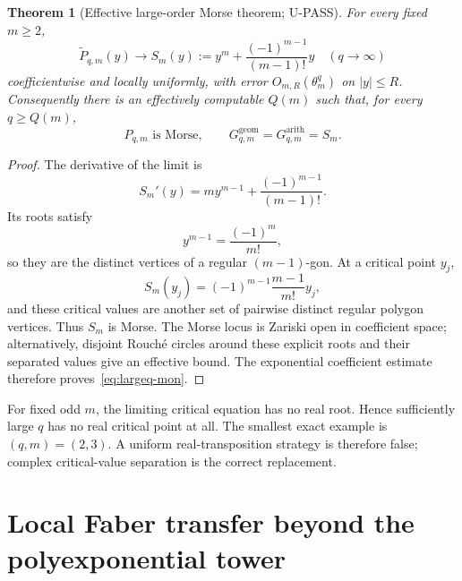 \documentclass[11pt]{article}
\theoremstyle{keio}
\newtheorem{theorem}{Theorem}[section]
\theoremstyle{definition}
\theoremstyle{remark}
\newcommand{\UPASS}{\textcolor{keiogreen}{\textsf{U-PASS}}}
\begin{document}
\begin{theorem}[Effective large-order Morse theorem; \UPASS]\label{thm:largeq}
For every fixed $m\ge2$,
\begin{equation}
\boxed{
\widetilde P_{q,m}(y)
\longrightarrow
S_m(y):=y^m+\frac{(-1)^{m-1}}{(m-1)!}y
\quad(q\to\infty)}
\label{eq:limit}
\end{equation}
coefficientwise and locally uniformly, with error
$O_{m,R}(\theta_m^q)$ on $|y|\le R$. Consequently there is an effectively
computable $Q(m)$ such that, for every $q\ge Q(m)$,
\begin{equation}
\boxed{
P_{q,m}\text{ is Morse},
\qquad
G^{\mathrm{geom}}_{q,m}=G^{\mathrm{arith}}_{q,m}=S_m.}
\label{eq:largeq-mon}
\end{equation}
\end{theorem}

\begin{proof}
The derivative of the limit is
\[
S_m'(y)=my^{m-1}+\frac{(-1)^{m-1}}{(m-1)!}.
\]
Its roots satisfy
\[
y^{m-1}=\frac{(-1)^m}{m!},
\]
so they are the distinct vertices of a regular $(m-1)$-gon. At a critical
point $y_j$,
\[
S_m(y_j)=(-1)^{m-1}\frac{m-1}{m!}y_j,
\]
and these critical values are another set of pairwise distinct regular
polygon vertices. Thus $S_m$ is Morse. The Morse locus is Zariski open in
coefficient space; alternatively, disjoint Rouch\'e circles around these
explicit roots and their separated values give an effective bound. The
exponential coefficient estimate therefore proves~\eqref{eq:largeq-mon}.
\end{proof}

For fixed odd $m$, the limiting critical equation has no real root. Hence
sufficiently large $q$ has no real critical point at all. The smallest exact
example is $(q,m)=(2,3)$. A uniform real-transposition strategy is therefore
false; complex critical-value separation is the correct replacement.

\section{Local Faber transfer beyond the polyexponential tower}
\end{document}
